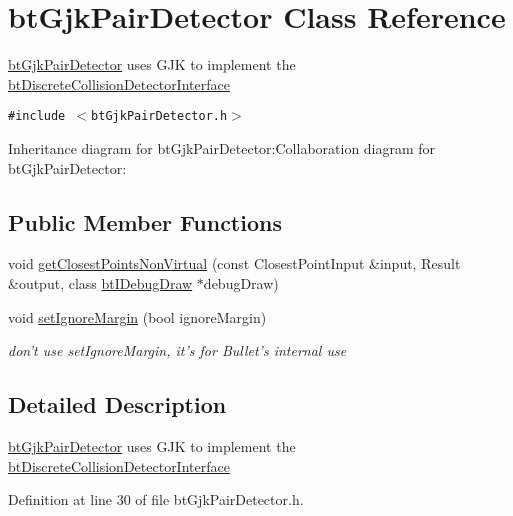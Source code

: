 \hypertarget{classbt_gjk_pair_detector}{
\section{btGjkPairDetector Class Reference}
\label{classbt_gjk_pair_detector}
}
\hyperlink{classbt_gjk_pair_detector}{btGjkPairDetector} uses GJK to implement the \hyperlink{structbt_discrete_collision_detector_interface}{btDiscreteCollisionDetectorInterface}  


{\tt \#include $<$btGjkPairDetector.h$>$}

Inheritance diagram for btGjkPairDetector:Collaboration diagram for btGjkPairDetector:\subsection*{Public Member Functions}
\begin{CompactItemize}
\item 
void \hyperlink{classbt_gjk_pair_detector_bc29953dd7aee59e9ca887963c26c8c2}{getClosestPointsNonVirtual} (const ClosestPointInput \&input, Result \&output, class \hyperlink{classbt_i_debug_draw}{btIDebugDraw} $\ast$debugDraw)
\item 
\hypertarget{classbt_gjk_pair_detector_93e9752920c57c39faca247fc005750e}{
void \hyperlink{classbt_gjk_pair_detector_93e9752920c57c39faca247fc005750e}{setIgnoreMargin} (bool ignoreMargin)}
\label{classbt_gjk_pair_detector_93e9752920c57c39faca247fc005750e}

\begin{CompactList}\small\item\em don't use setIgnoreMargin, it's for Bullet's internal use \item\end{CompactList}\end{CompactItemize}


\subsection{Detailed Description}
\hyperlink{classbt_gjk_pair_detector}{btGjkPairDetector} uses GJK to implement the \hyperlink{structbt_discrete_collision_detector_interface}{btDiscreteCollisionDetectorInterface} 

Definition at line 30 of file btGjkPairDetector.h.

